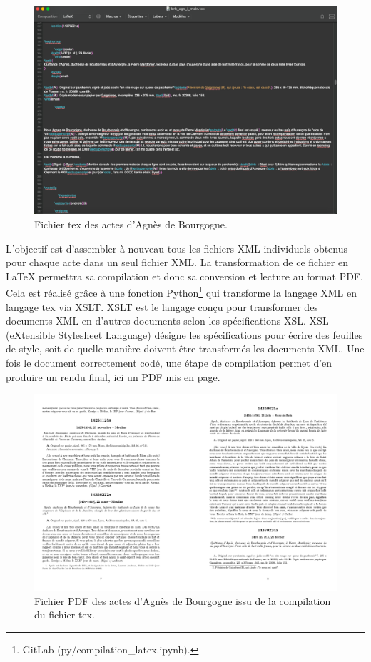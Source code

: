 \begin{figure}[H]
    \centering
    \includegraphics[scale=0.39]{img/latex.png}
    \caption{Fichier tex des actes d'Agnès de Bourgogne.}
    \label{fig:latex_agnes_db}
\end{figure}

\newpage 

\par L'objectif est d'assembler à nouveau tous les fichiers XML individuels obtenus pour chaque acte dans un seul fichier XML. La transformation de ce fichier en LaTeX permettra sa compilation et donc sa conversion et lecture au format PDF. Cela est réalisé grâce à une fonction Python\footnote{GitLab (py/compilation\_latex.ipynb).} qui transforme la langage XML en langage tex via XSLT. XSLT est le langage conçu pour transformer des documents XML en d’autres documents selon les spécifications XSL. XSL (eXtensible Stylesheet Language) désigne les spécifications pour écrire des feuilles de style, soit de quelle manière doivent être transformés les documents XML. Une fois le document correctement codé, une étape de compilation permet d'en produire un rendu final, ici un PDF mis en page. 

\begin{figure}[H]
    \centering
    \includegraphics[scale=0.41]{img/pdf_compile_ab.png}
    \caption{Fichier PDF des actes d'Agnès de Bourgogne issu de la compilation du fichier tex.}
    \label{fig:pdf_conpile}
\end{figure} 


